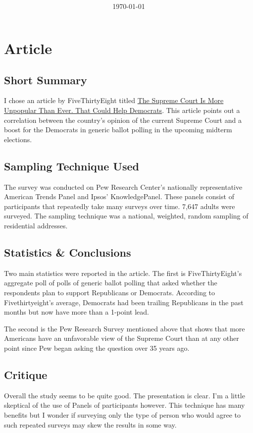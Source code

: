\documentclass[12pt,fleqn]{article}
\title{\classdescription\ \\ \classname\ \\ $\ $ \\ \assignment}
\author{\authorname}
\date{\today}
\begin{document}
\maketitle

\section{Article}
\subsection{Short Summary}
I chose an article by FiveThirtyEight titled \href{https://fivethirtyeight.com/features/the-supreme-court-is-more-unpopular-than-ever-that-could-help-democrats/}{The Supreme Court Is More Unpopular Than Ever. That Could Help Democrats}. This article points out a correlation between the country's opinion of the current Supreme Court and a boost for the Democrats in generic ballot polling in the upcoming midterm elections.

\subsection{Sampling Technique Used}
The survey was conducted on Pew Research Center's nationally representative American Trends Panel and Ipsos' KnowledgePanel. These panels consist of participants that repeatedly take many surveys over time. 7,647 adults were surveyed. The sampling technique was a national, weighted, random sampling of residential addresses.

\subsection{Statistics \& Conclusions}
Two main statistics were reported in the article. The first is FiveThirtyEight's aggregate poll of polls of generic ballot polling that asked whether the respondents plan to support Republicans or Democrats. According to Fivethirtyeight's average, Democrats had been trailing Republicans in the past months but now have more than a 1-point lead.

The second is the Pew Research Survey mentioned above that shows that more Americans have an unfavorable view of the Supreme Court than at any other point since Pew began asking the question over 35 years ago.

\subsection{Critique}
Overall the study seems to be quite good. The presentation is clear. I'm a little skeptical of the use of Panels of participants however. This technique has many benefits but I wonder if surveying only the type of person who would agree to such repeated surveys may skew the results in some way.
\end{document}
